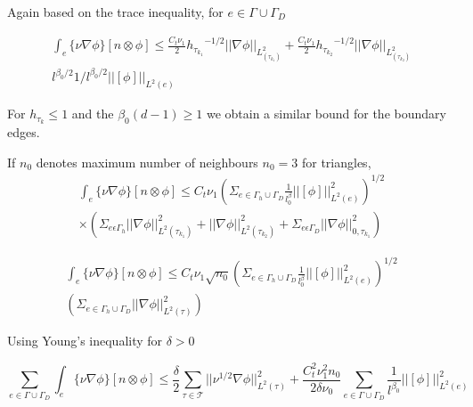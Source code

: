 \documentclass[a4paper,12pt]{book}
\begin{document}
Again based on the trace inequality, for $e \in \Gamma \cup \Gamma_D$

\begin{equation}
\begin{split}
\int_e \lbrace \nu \nabla \phi \rbrace[n \otimes \phi] \leq \frac{C_t \nu_1}{2} {h_{{\tau_{k_1}}}}^{-1/2} ||\nabla \phi||_{L^2_{(\tau_{k_1})}} + \frac{C_t \nu_1}{2} {h_{{\tau_{k_2}}}}^{-1/2} ||\nabla \phi||_{L^2_{(\tau_{k_2})}} \\  
l^{\beta_0/2} {1/l}^{\beta_0/2} ||[\phi]||_{L^2(e)}
\end{split}
\end{equation}

For $h_{\tau_k} \leq 1$ and the $\beta_0 (d-1) \geq 1$ we obtain a similar bound for the boundary edges.

If $n_0$ denotes maximum number of neighbours $n_0 = 3$ for triangles,
\begin{equation}
\begin{split}
\int_e \lbrace \nu \nabla \phi \rbrace[n \otimes \phi] \leq C_t \nu_1 \left( \Sigma_{e \in \Gamma_h \cup \Gamma_D} \frac{1}{l^\beta_0} ||[\phi]||^2_{L^2(e)} \right)^{1/2} \\ \times \left( \Sigma_{e \epsilon \Gamma_h} ||\nabla \phi||^2_{L^2(\tau_{k_1})} + ||\nabla \phi||^2_{L^2(\tau_{k_2})} + \Sigma_{e \epsilon \Gamma_D} ||\nabla \phi||^2_{0,\tau_{k_1}} \right)
\end{split}
\end{equation}

\begin{equation}
\begin{split}
\int_e \lbrace \nu \nabla \phi \rbrace[n \otimes \phi] \leq C_t \nu_1 \sqrt{n_0} \left( \Sigma_{e \in \Gamma_h \cup \Gamma_D} \frac{1}{l^\beta_0} ||[\phi]||^2_{L^2(e)} \right)^{1/2} \\ \left( \Sigma_{e \in \Gamma_h \cup \Gamma_D} ||\nabla \phi||^2_{L^2(\tau)} \right)
\end{split}
\end{equation}

Using Young's inequality for $\delta > 0$

\begin{equation}
\sum_{e \in \Gamma \cup \Gamma_D} \int_e \lbrace \nu \nabla \phi \rbrace [n \otimes \phi] \leq \frac{\delta}{2} \sum_{\tau \in \mathcal{T}} ||\nu^{1/2} \nabla \phi ||^2_{L^2(\tau)} +  \frac{C_t^2 \nu_1^2 n_0}{2 \delta \nu_0}  \sum_{e \in \Gamma \cup \Gamma_D} \frac{1}{l^{\beta_0}} ||[\phi]||^2_{L^2(e)}
\end{equation}
\end{document}
